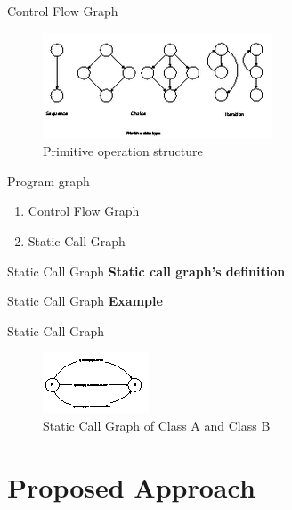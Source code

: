 \documentclass{beamer}
\begin{document}
\begin{frame}{Control Flow Graph}
    \begin{figure}
        \includegraphics[width=0.7\paperwidth]{figure/Primitive-Operation-Structure}
        \caption{Primitive operation structure \parencite{McCabe1976}}
        \label{fig:primitivestructure}
    \end{figure}
\end{frame}

\begin{frame}{Program graph}
    \begin{enumerate}
        \item<1-> Control Flow Graph
        \item<2-> Static Call Graph
    \end{enumerate}
\end{frame}

\begin{frame}{Static Call Graph}
    \textbf{Static call graph's definition}
\end{frame}

\begin{frame}{Static Call Graph}
    \textbf{Example}
\end{frame}

\begin{frame}{Static Call Graph}
    \begin{figure}
        \includegraphics[width=0.6\paperwidth]{figure/SCG-A-and-B}
        \caption{Static Call Graph of Class A and Class B}
        \label{fig:staticCallGraphAandB}
    \end{figure}
\end{frame}


%
\section{Proposed Approach}
\end{document}
